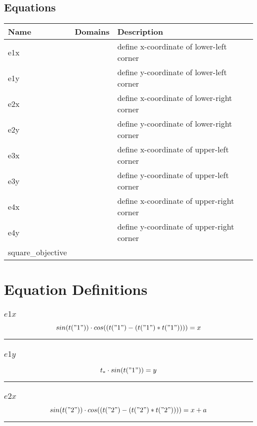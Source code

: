 \documentclass[11pt]{article}
\begin{document}
\subsection*{Equations}
\begin{tabularx}{\textwidth}{| l | l | X |}
\hline
\textbf{Name} & \textbf{Domains} & \textbf{Description}\\
\hline
\endhead

e1x &  & define x-coordinate of lower-left corner\\
e1y &  & define y-coordinate of lower-left corner\\
e2x &  & define x-coordinate of lower-right corner\\
e2y &  & define y-coordinate of lower-right corner\\
e3x &  & define x-coordinate of upper-left corner\\
e3y &  & define y-coordinate of upper-left corner\\
e4x &  & define x-coordinate of upper-right corner\\
e4y &  & define y-coordinate of upper-right corner\\
square\_objective &  & \\
\hline
\end{tabularx}
\section*{Equation Definitions}
\subsubsection*{$e1x$}
\begin{equation}
 sin(t("1"))  \cdot  cos((t("1") - (t("1") * t("1"))))  = x
\end{equation}
\vspace{5pt}
\hrule
\subsubsection*{$e1y$}
\begin{equation}
t_{*} \cdot  sin(t("1"))  = y
\end{equation}
\vspace{5pt}
\hrule
\subsubsection*{$e2x$}
\begin{equation}
 sin(t("2"))  \cdot  cos((t("2") - (t("2") * t("2"))))  = x + a
\end{equation}
\vspace{5pt}
\hrule
\end{document}
